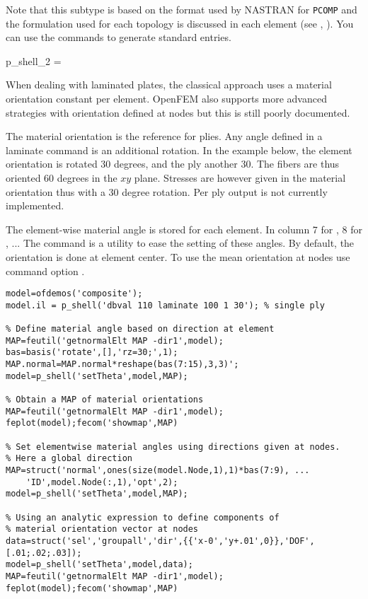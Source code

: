 Note that this subtype is based on the format used by NASTRAN for {\tt PCOMP} and the formulation used for each topology is discussed in each element (see \quada, \triaa). You can use the  commands to generate standard entries.

\begin{eqsvg}{p_shell_2}
 =  
\end{eqsvg}


When dealing with laminated plates, the classical approach uses a material orientation constant per element. OpenFEM also supports more advanced strategies with orientation defined at nodes but this is still poorly documented.

The material orientation is the reference for plies. Any angle defined in a laminate command is an additional rotation. In the example below, the element orientation is rotated 30 degrees, and the ply another 30. The fibers are thus oriented 60 degrees in the $xy$ plane. Stresses are however given in the material orientation thus with a 30 degree rotation. Per ply output is not currently implemented. 

The element-wise material angle is stored for each element. In column 7 for \triaa, 8 for \quada, ...  The  command is a utility to ease the setting of these angles. By default, the orientation is done at element center. To use the mean orientation at nodes use command option .

\begin{verbatim}
model=ofdemos('composite');
model.il = p_shell('dbval 110 laminate 100 1 30'); % single ply

% Define material angle based on direction at element
MAP=feutil('getnormalElt MAP -dir1',model);
bas=basis('rotate',[],'rz=30;',1);
MAP.normal=MAP.normal*reshape(bas(7:15),3,3)';
model=p_shell('setTheta',model,MAP);

% Obtain a MAP of material orientations
MAP=feutil('getnormalElt MAP -dir1',model);
feplot(model);fecom('showmap',MAP)

% Set elementwise material angles using directions given at nodes. 
% Here a global direction
MAP=struct('normal',ones(size(model.Node,1),1)*bas(7:9), ...
    'ID',model.Node(:,1),'opt',2);
model=p_shell('setTheta',model,MAP);

% Using an analytic expression to define components of 
% material orientation vector at nodes
data=struct('sel','groupall','dir',{{'x-0','y+.01',0}},'DOF',[.01;.02;.03]);
model=p_shell('setTheta',model,data);
MAP=feutil('getnormalElt MAP -dir1',model);
feplot(model);fecom('showmap',MAP)
\end{verbatim}

